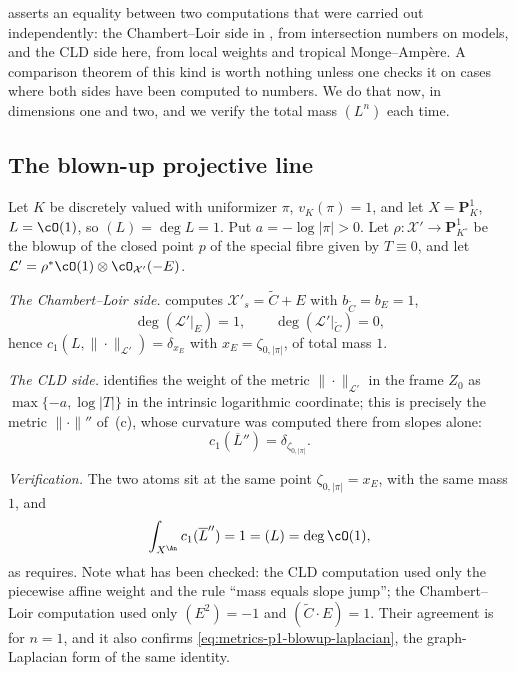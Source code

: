  asserts an equality between two computations that
were carried out independently: the Chambert--Loir side in
, from intersection numbers on models, and the
CLD side here, from local weights and tropical Monge--Amp\`ere.  A
comparison theorem of this kind is worth nothing unless one checks it on
cases where both sides have been computed to numbers.  We do that now, in
dimensions one and two, and we verify the total mass $(L^n)$ each time.

\subsection{The blown-up projective line}
\label{sec:ch17-check-p1}

\begin{example}
\label{ex:ch17-check-p1}
Let $K$ be discretely valued with uniformizer $\pi$, $v_K(\pi)=1$, and
let $X=\mathbf P^1_K$, $L=\cO(1)$, so $(L)=\deg L=1$.  Put
$a=-\log|\pi|>0$.  Let
$\rho:\mathcal X'\to\mathbf P^1_{K^\circ}$ be the blowup of the closed
point $p$ of the special fibre given by $T\equiv0$, and let
$\mathcal L'=\rho^*\cO(1)\otimes\cO_{\mathcal X'}(-E)$.

\emph{The Chambert--Loir side.}   computes
$\mathcal X'_s=\widetilde C+E$ with $b_{\widetilde C}=b_E=1$,
\[
 \deg(\mathcal L'|_E)=1,\qquad
 \deg(\mathcal L'|_{\widetilde C})=0,
\]
hence
$c_1(L,\|\cdot\|_{\mathcal L'})=\delta_{x_E}$ with
$x_E=\zeta_{0,|\pi|}$, of total mass $1$.

\emph{The CLD side.}   identifies the weight of
the metric $\|\cdot\|_{\mathcal L'}$ in the frame $Z_0$ as
$\max\{-a,\log|T|\}$ in the intrinsic logarithmic coordinate; this is precisely the metric
$\|\cdot\|''$ of \,(c), whose curvature was
computed there from slopes alone:
\[
 c_1(\overline L'')=\delta_{\zeta_{0,|\pi|}}.
\]

\emph{Verification.}  The two atoms sit at the same point
$\zeta_{0,|\pi|}=x_E$, with the same mass $1$, and
\[
 \int_{X^{\An}}c_1(\overline L'')=1=(L)=\deg\cO(1),
\]
as  requires.  Note what has been checked: the CLD
computation used only the piecewise affine weight and the rule ``mass equals
slope jump''; the Chambert--Loir computation used only
$(E^2)=-1$ and $(\widetilde C\cdot E)=1$.  Their agreement is
 for $n=1$, and it also confirms
\eqref{eq:metrics-p1-blowup-laplacian}, the graph-Laplacian form of the same
identity.
\end{example}

